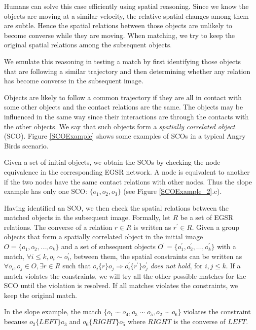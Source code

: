 \documentclass[letterpaper]{article}
\begin{document}
Humans can solve this case efficiently using spatial reasoning. Since we know the objects are moving at a similar velocity, the relative spatial changes among them are subtle. Hence the spatial relations between those objects are unlikely to become converse while they are moving. When matching, we try to keep the original spatial relations among the subsequent objects. 

We emulate this reasoning in testing a match by first identifying those objects that are following a similar trajectory and then determining whether any relation has become converse in the subsequent image. 

Objects are likely to follow a common trajectory if they are all in contact with some other objects and the contact relations are the same. The objects may be influenced in the same way since their interactions are through the contacts with the other objects. We say that such objects form a \emph{spatially correlated object} (SCO). Figure \ref{SCOExample} shows some examples of SCOs in a typical Angry Birds scenario.

Given a set of initial objects, we obtain the SCOs by checking the node equivalence in the corresponding EGSR network. A node is equivalent to another if the two nodes have the same contact relations with other nodes. Thus the slope example has only one SCO: $\{o_1, o_2, o_3\}$ (see Figure \ref{SCOExample_2}.c).

Having identified an SCO, we then check the spatial relations between the matched objects in the subsequent image. Formally, let $R$ be a set of EGSR relations. The converse of a relation $r \in R$ is written as $r^{\prime} \in R$. Given a group objects that form a spatially correlated object in the initial image $O = \{o_1, o_2, ... , o_k\}$ and a set of subsequent objects $O^\prime = \{o^{\prime}_1, o^{\prime}_2, ..., o^{\prime}_k \}$ with a match, $\forall i\leq k, o_i \sim o^{\prime}_i$, between them, the spatial constraints can be written as $\forall o_i,o_j\in O, \exists r\in R$ such that $o_i \{r\} o_j \Rightarrow o^{\prime}_i \{r^{\prime}\} o^{\prime}_j$ \emph{does not hold}, for $i,j \leq k$. If a match violates the constraints, we will try all the other possible matches for the SCO until the violation is resolved. If all matches violates the constraints, we keep the original match.  

In the slope example, the match $\{o_1\sim o_4, o_3\sim o_5, o_2 \sim o_6\}$ violates the constraint because $o_2\{LEFT\}o_3$ and $o_6\{RIGHT\}o_5$ where $RIGHT$ is the converse of $LEFT$.
\end{document}
